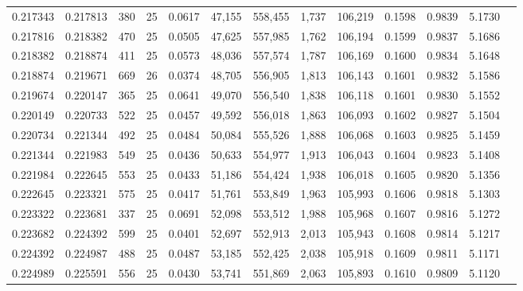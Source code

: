 \begin{tabular}{rrrrrrrrrrrrr}
0.217343 & 0.217813 &   380 &  25 &                                     0.0617 &  47,155 & 558,455 &   1,737 & 106,219 & 0.1598 & 0.9839 & 5.1730 \\
0.217816 & 0.218382 &   470 &  25 &                                     0.0505 &  47,625 & 557,985 &   1,762 & 106,194 & 0.1599 & 0.9837 & 5.1686 \\
0.218382 & 0.218874 &   411 &  25 &                                     0.0573 &  48,036 & 557,574 &   1,787 & 106,169 & 0.1600 & 0.9834 & 5.1648 \\
0.218874 & 0.219671 &   669 &  26 &                                     0.0374 &  48,705 & 556,905 &   1,813 & 106,143 & 0.1601 & 0.9832 & 5.1586 \\
0.219674 & 0.220147 &   365 &  25 &                                     0.0641 &  49,070 & 556,540 &   1,838 & 106,118 & 0.1601 & 0.9830 & 5.1552 \\
0.220149 & 0.220733 &   522 &  25 &                                     0.0457 &  49,592 & 556,018 &   1,863 & 106,093 & 0.1602 & 0.9827 & 5.1504 \\
0.220734 & 0.221344 &   492 &  25 &                                     0.0484 &  50,084 & 555,526 &   1,888 & 106,068 & 0.1603 & 0.9825 & 5.1459 \\
0.221344 & 0.221983 &   549 &  25 &                                     0.0436 &  50,633 & 554,977 &   1,913 & 106,043 & 0.1604 & 0.9823 & 5.1408 \\
0.221984 & 0.222645 &   553 &  25 &                                     0.0433 &  51,186 & 554,424 &   1,938 & 106,018 & 0.1605 & 0.9820 & 5.1356 \\
0.222645 & 0.223321 &   575 &  25 &                                     0.0417 &  51,761 & 553,849 &   1,963 & 105,993 & 0.1606 & 0.9818 & 5.1303 \\
0.223322 & 0.223681 &   337 &  25 &                                     0.0691 &  52,098 & 553,512 &   1,988 & 105,968 & 0.1607 & 0.9816 & 5.1272 \\
0.223682 & 0.224392 &   599 &  25 &                                     0.0401 &  52,697 & 552,913 &   2,013 & 105,943 & 0.1608 & 0.9814 & 5.1217 \\
0.224392 & 0.224987 &   488 &  25 &                                     0.0487 &  53,185 & 552,425 &   2,038 & 105,918 & 0.1609 & 0.9811 & 5.1171 \\
0.224989 & 0.225591 &   556 &  25 &                                     0.0430 &  53,741 & 551,869 &   2,063 & 105,893 & 0.1610 & 0.9809 & 5.1120 \\

\end{tabular}
